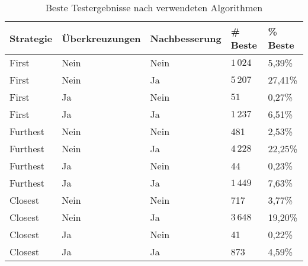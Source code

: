 \begin{center}
    \begin{table}
        \begin{tabular}{ l | l | l | l | l }
            \textbf{Strategie} & \textbf{Überkreuzungen} & \textbf{Nachbesserung} & \textbf{\# Beste} & \textbf{\% Beste} \\ \hline
            First & Nein & Nein & $1\,024$ & 5,39\% \\
            First & Nein & Ja & $5\,207$ & 27,41\% \\
            First & Ja & Nein & $51$ &  0,27\% \\
            First & Ja & Ja & $1\,237$ & 6,51\% \\ \hline
            Furthest & Nein & Nein &  481 & 2,53\% \\
            Furthest & Nein & Ja & $4\,228$ & 22,25\% \\
            Furthest & Ja & Nein & 44 & 0,23\% \\
            Furthest & Ja & Ja & $1\,449$ & 7,63\% \\ \hline
            Closest & Nein & Nein & 717 & 3,77\% \\
            Closest & Nein & Ja & $3\,648$ & 19,20\% \\
            Closest & Ja & Nein & 41 & 0,22\% \\
            Closest & Ja & Ja & 873 & 4,59\% \\ \hline
        \end{tabular}
        \caption{Beste Testergebnisse nach verwendeten Algorithmen}
        \label{tab:test-results1}
    \end{table}
\end{center}

